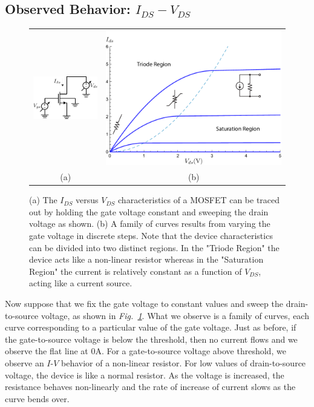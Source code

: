 \subsection{Observed Behavior: \texorpdfstring{$I_{DS} - V_{DS}$}{Drain Current vs. Drain Voltage}}
\begin{figure}[tb]
\centering
\begin{tabular}{cc}
\includegraphics[width=.3\columnwidth]{idvds_sweep} &
\includegraphics[width=.6\columnwidth]{ids_vds}\\
(a) & (b)\\
\end{tabular}
\caption{(a) The $I_{DS}$ versus $V_{DS}$ characteristics of a MOSFET can be traced out by holding the gate voltage constant and sweeping the drain voltage as shown.  (b) A family of curves results from varying the gate voltage in discrete steps.  Note that the device characteristics can be divided into two distinct regions.  In the "Triode Region" the device acts like a non-linear resistor whereas in the "Saturation Region" the current is relatively constant as a function of $V_{DS}$, acting like a current source.}
\label{fig:ids_vds}
\end{figure}
Now suppose that we fix the gate voltage to constant values and sweep the drain-to-source voltage, as shown in \emph{Fig.~\ref{fig:ids_vds}}.  What we observe is a family of curves, each curve corresponding to a particular value of the gate voltage.  Just as before, if the gate-to-source voltage is below the threshold, then no current flows and we observe the flat line at $0$A. For a gate-to-source voltage above threshold, we observe an $I$-$V$ behavior of a non-linear resistor.  For low values of drain-to-source voltage, the device is like a normal resistor. As the voltage is increased, the resistance behaves non-linearly and the rate of increase of current slows as the curve bends over.  
